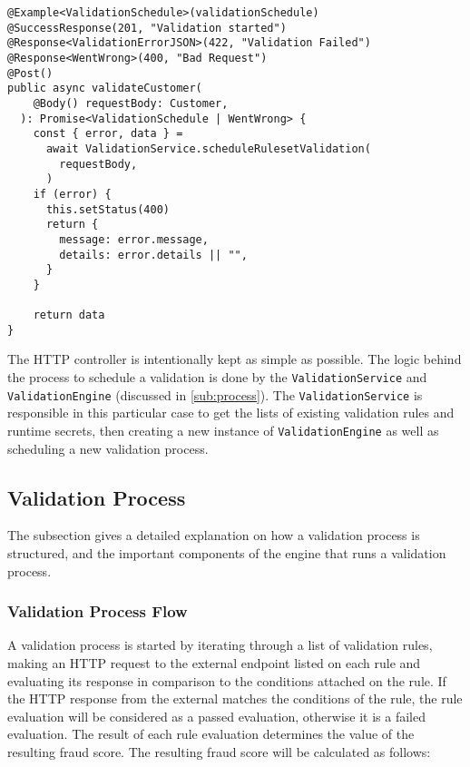     \begin{lstlisting}[style=es6, caption={HTTP controller to schedule a validation process (TypeScript)}]
@Example<ValidationSchedule>(validationSchedule)
@SuccessResponse(201, "Validation started")
@Response<ValidationErrorJSON>(422, "Validation Failed")
@Response<WentWrong>(400, "Bad Request")
@Post()
public async validateCustomer(
    @Body() requestBody: Customer,
  ): Promise<ValidationSchedule | WentWrong> {
    const { error, data } =
      await ValidationService.scheduleRulesetValidation(
        requestBody,
      )
    if (error) {
      this.setStatus(400)
      return {
        message: error.message,
        details: error.details || "",
      }
    }

    return data
}
\end{lstlisting}

    The HTTP controller is intentionally kept as simple as possible. The logic behind the process to schedule a validation is done by the \verb;ValidationService; and \verb;ValidationEngine; (discussed in \autoref{sub:process}). The \verb;ValidationService; is responsible in this particular case to get the lists of existing validation rules and runtime secrets, then creating a new instance of \verb;ValidationEngine; as well as scheduling a new validation process. 

  \subsection{Validation Process}
    \label{sub:process}
    
    The subsection gives a detailed explanation on how a validation process is structured, and the important components of the engine that runs a validation process. 

    \subsubsection{Validation Process Flow}
      \label{impl_cl:flow}
    
      A validation process is started by iterating through a list of validation rules, making an HTTP request to the external endpoint listed on each rule and evaluating its response in comparison to the conditions attached on the rule. If the HTTP response from the external matches the conditions of the rule, the rule evaluation will be considered as a passed evaluation, otherwise it is a failed evaluation. The result of each rule evaluation determines the value of the resulting fraud score. The resulting fraud score will be calculated as follows: 

